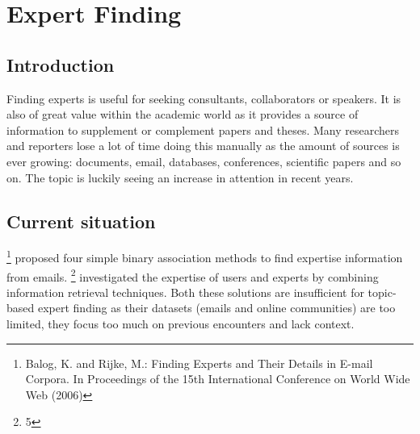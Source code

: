\section{Expert Finding}

\subsection{Introduction}

Finding experts is useful for seeking consultants, collaborators or speakers. It is also of great value within the academic world as it provides a source of information to supplement or complement papers and theses. Many researchers and reporters lose a lot of time doing this manually as the amount of sources is ever growing: documents, email, databases, conferences, scientific papers and so on. The topic is luckily seeing an increase in attention in recent years.


\subsection{Current situation}

\footnote{Balog, K. and Rijke, M.: Finding Experts and Their Details in E-mail Corpora. In Proceedings
of the 15th International Conference on World Wide Web (2006)} proposed four simple binary association methods to find expertise information from emails. \footnote{5} investigated the expertise of users and experts by combining information retrieval techniques. Both these solutions are insufficient for topic-based expert finding as their datasets (emails and online communities) are too limited, they focus too much on previous encounters and lack context.


